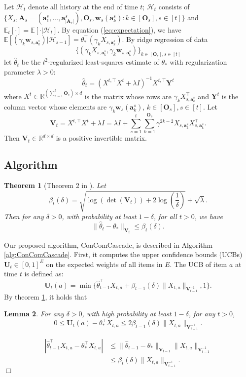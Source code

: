 \documentclass{article}
\newcommand{\bA}{\mathbf{A}}
\newcommand{\ba}{\mathbf{a}}
\newcommand{\bO}{\mathbf{O}}
\newcommand{\bU}{\mathbf{U}}
\newcommand{\bV}{\mathbf{V}}
\newcommand{\bw}{\mathbf{w}}
\newcommand{\bY}{\mathbf{Y}}
\newcommand{\cH}{\mathcal{H}}
\newcommand{\EE}{\mathbb{E}}
\newcommand{\RR}{\mathbb{R}}
\newcommand{\abs}[1]{\left| #1 \right|}
\newcommand{\norm}[1]{\| #1 \|}
\newtheorem{theorem}{Theorem}[section]
\newtheorem{lemma}[theorem]{Lemma}%
\newenvironment{proof}{\noindent {\textbf{Proof. }}}{$\Box$ \medskip}
\begin{document}
Let $\cH_t$ denote all history at the end of time $t$; $\cH_t$ consists of $\{X_s, \bA_s=(\ba_{1}^s,...,\ba_{\abs{\bA_s}}^s), \bO_s, \bw_s(\ba_k^s): k \in[\bO_s], s\in[t] \}$ and $\EE_t[\cdot] = \EE[\cdot | \cH_t]$. By equation (\ref{eq:expectation}), we have $\EE[(\gamma_k\bw_{s,\ba_k^s}) | \cH_{s-1}] = \theta_*^{\top} (\gamma_k X_{s,\ba_k^s})$. By ridge regression of data 
$$
\{(\gamma_k X_{s,\ba_k^s}, \gamma_k\bw_{s,\ba_k^s})\}_{k \in[\bO_s], s\in[t]}
$$
let $\hat{\theta}_t$ be the $l^2$-regularized least-squares estimate of $\theta_*$ with regularization parameter $\lambda > 0$:
\begin{equation}
\hat{\theta}_t = (X^{t,\top}X^{t} + \lambda I)^{-1} X^{t, \top} \bY^t
\end{equation}
where $X^t \in \RR^{(\sum_{s=1}^{t}\bO_s) \times d}$ is the matrix whose rows are $\gamma_k X_{s,\ba_k^s}^{\top}$ and $\bY^t$ is the column vector whose elements are $\gamma_k \bw_s(\ba_k^s)$, $k \in[\bO_s], s\in[t]$. Let
$$
\bV_t = X^{t,\top}X^{t} + \lambda I = \lambda I + \sum_{s=1}^{t} \sum_{k=1}^{\bO_s} \gamma^{2k-2}X_{s,\ba_k^s}X_{s,\ba_k^s}^{\top}.
$$
Then $\bV_t \in \RR^{d \times d}$ is a positive invertible matrix.
\subsection{Algorithm}

\begin{theorem}[Theorem 2 in \cite{abbasi2011improved}]
	\label{thm:theta_estimate}
	Let 
	$$
		\beta_{t}(\delta) = \sqrt{\log(\det(\bV_{t})) + 2 \log(\frac{1}{\delta})} + \sqrt{\lambda}.
	$$
	Then for any $\delta > 0$, with probability at least $1 - \delta$, for all $t > 0$, we have
	\begin{equation}
	\norm{\hat{\theta}_t - \theta_*}_{\bV_{t}} \leq \beta_{t}(\delta).
	\end{equation}
\end{theorem}

Our proposed algorithm, ConComCascade, is described in Algorithm \ref{alg:ConComCascade}. First, it computes the upper confidence bounds (UCBs) $\bU_t \in [0,1]^{E}$ on the expected weights of all items in $E$. The UCB of item $a$ at time $t$ is defined as:
\begin{equation}
	\bU_t(a) = \min\{\hat{\theta}_{t-1}^{\top}X_{t,a} + \beta_{t-1}(\delta)\norm{X_{t,a}}_{\bV_{t-1}^{-1}}, 1\}.
\end{equation}
By theorem \ref{thm:theta_estimate}, it holds that
\begin{lemma}
	For any $\delta > 0$, with high probability at least $1 - \delta$, for any $t>0$,
	$$
		0 \leq \bU_t(a) - \theta_*^{\top}X_{t,a} \leq 2\beta_{t-1}(\delta)\norm{X_{t,a}}_{\bV_{t-1}^{-1}}.
	$$
\end{lemma}
\begin{proof}
	\begin{align*}
	\abs{\hat{\theta}_{t-1}^{\top}X_{t,a} - \theta_*^{\top}X_{t,a}} &\leq \norm{\hat{\theta}_{t-1} - \theta_*}_{\bV_{t-1}} \norm{X_{t,a}}_{\bV_{t-1}^{-1}} \\
	&\leq \beta_{t}(\delta)\norm{X_{t,a}}_{\bV_{t-1}^{-1}}.
	\end{align*}
\end{proof}
\end{document}
